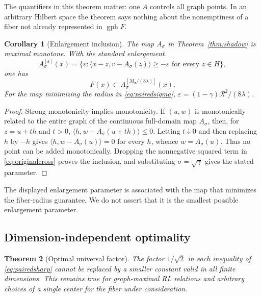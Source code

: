 \documentclass[11pt]{article}
\numberwithin{equation}{section}
\newtheorem{theorem}{Theorem}[section]
\newtheorem{corollary}[theorem]{Corollary}
\theoremstyle{definition}
\theoremstyle{remark}
\newcommand{\gph}{\operatorname{gph}}
\newcommand{\rad}{\mathcal R}
\newcommand{\ip}[2]{\langle #1,#2\rangle}
\newcommand{\eps}{\varepsilon}
\begin{document}
The quantifiers in this theorem matter: one $A$ controls all graph points.
In an arbitrary Hilbert space the theorem says nothing about the
nonemptiness of a fiber not already represented in $\gph F$.

\begin{corollary}[Enlargement inclusion]\label{cor:enlargement}
The map $A_\sigma$ in Theorem~\ref{thm:shadow} is maximal monotone. With
the standard enlargement
\[
 A_\sigma^{[\eps]}(x)=
 \{v:\ip{x-z}{v-A_\sigma(z)}\ge-\eps\text{ for every }z\in H\},
\]
one has
\begin{equation}\label{eq:enlargement}
 F(x)\subset A_\sigma^{[M_\sigma/(8\lambda)]}(x).
\end{equation}
For the map minimizing the radius in \eqref{eq:pairedsigma},
$\eps=(1-\gamma)\rad^2/(8\lambda)$.
\end{corollary}

\begin{proof}
Strong monotonicity implies monotonicity. If $(u,w)$ is monotonically
related to the entire graph of the continuous full-domain map $A_\sigma$,
then, for $z=u+th$ and $t>0$,
$\ip{h}{w-A_\sigma(u+th)}\le0$. Letting $t\downarrow0$ and then
replacing $h$ by $-h$ gives
$\ip{h}{w-A_\sigma(u)}=0$ for every $h$, whence $w=A_\sigma(u)$.
Thus no point can be added monotonically. Dropping the nonnegative
squared term in \eqref{eq:originalcross} proves the inclusion, and
substituting $\sigma=\sqrt\gamma$ gives the stated parameter.
\end{proof}

The displayed enlargement parameter is associated with the map that
minimizes the fiber-radius guarantee. We do not assert that it is the
smallest possible enlargement parameter.

\subsection{Dimension-independent optimality}

\begin{theorem}[Optimal universal factor]\label{thm:sharpness}
The factor $1/\sqrt2$ in each inequality of \eqref{eq:pairedsharp} cannot
be replaced by a smaller constant valid in all finite dimensions. This
remains true for graph-maximal RL relations and arbitrary choices of a
single center for the fiber under consideration.
\end{theorem}
\end{document}
